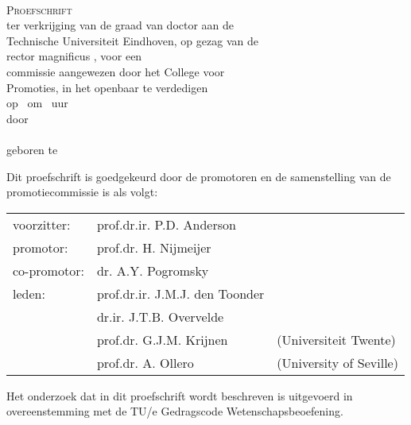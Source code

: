 \thispagestyle{empty}
\vspace*{30mm}
\begin{center}
{\LARGE\sf\maintitle}\\[30mm] %
{\large\textsc{Proefschrift}}\\[8mm]
ter verkrijging van de graad van doctor aan de\\
Technische Universiteit Eindhoven, op gezag van de\\
rector magnificus \rector, voor een\\
commissie aangewezen door het College voor\\
Promoties, in het openbaar te verdedigen\\
op \ om \ uur\\[8mm]
door\\[8mm]
\@author\\[8mm]
geboren te \placeofbirth
\end{center}
\vfill

\newpage
\thispagestyle{empty}

\noindent
Dit proefschrift is goedgekeurd door de promotoren en de samenstelling van de promotiecommissie is als volgt:\\[7mm]

\noindent
\begin{tabular}{@{}l p{4.8cm} p{5.8cm}}
voorzitter:                 &   prof.dr.ir. P.D. Anderson \\
promotor:                   &   prof.dr. H. Nijmeijer \\
co-promotor:                &   dr. A.Y. Pogromsky \\
leden:                      &   prof.dr.ir. J.M.J. den Toonder  \\
&   dr.ir. J.T.B. Overvelde &  \\
                            &   prof.dr. G.J.M. Krijnen & (Universiteit Twente) \\
                            &   prof.dr. A. Ollero  &  (University of Seville) \\
\end{tabular}

\vfill
\noindent
Het onderzoek dat in dit proefschrift wordt beschreven is uitgevoerd in overeenstemming met de TU/e Gedragscode Wetenschapsbeoefening.
